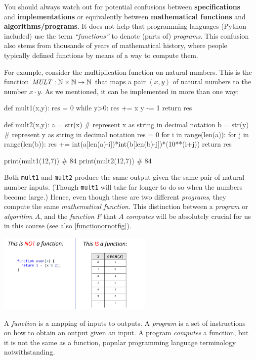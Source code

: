 You should always watch out for potential confusions between
\textbf{specifications} and \textbf{implementations} or equivalently
between \textbf{mathematical functions} and
\textbf{algorithms/programs}. It does not help that programming
languages (Python included) use the term \emph{``functions''} to denote
(parts of) \emph{programs}. This confusion also stems from thousands of
years of mathematical history, where people typically defined functions
by means of a way to compute them.

For example, consider the multiplication function on natural numbers.
This is the function
\(\mathit{MULT}:{\mathbb{N}}\times {\mathbb{N}} \rightarrow {\mathbb{N}}\) that maps a
pair \((x,y)\) of natural numbers to the number \(x \cdot y\). As we
mentioned, it can be implemented in more than one way:

\begin{code}
def mult1(x,y):
    res = 0
    while y>0:
        res += x
        y   -= 1
    return res

def mult2(x,y):
    a = str(x) # represent x as string in decimal notation
    b = str(y) # represent y as string in decimal notation
    res = 0
    for i in range(len(a)):
        for j in range(len(b)):
            res += int(a[len(a)-i])*int(b[len(b)-j])*(10**(i+j))
    return res

print(mult1(12,7))
# 84
print(mult2(12,7))
# 84
\end{code}

Both \texttt{mult1} and \texttt{mult2} produce the same output given the
same pair of natural number inputs. (Though \texttt{mult1} will take far
longer to do so when the numbers become large.) Hence, even though these
are two different \emph{programs}, they compute the same
\emph{mathematical function}. This distinction between a \emph{program}
or \emph{algorithm} \(A\), and the \emph{function} \(F\) that \(A\)
\emph{computes} will be absolutely crucial for us in this course (see
also \cref{functionornotfig}).


\begin{marginfigure}
\centering
\includegraphics[width=\linewidth, height=1.5in, keepaspectratio]{../figure/functionornot.png}
\caption{A \emph{function} is a mapping of inputs to outputs. A
\emph{program} is a set of instructions on how to obtain an output given
an input. A program \emph{computes} a function, but it is not the same
as a function, popular programming language terminology
notwithstanding.}
\label{functionornotfig}
\end{marginfigure}

